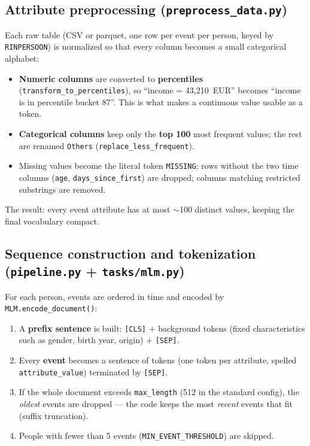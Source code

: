 \documentclass[11pt,a4paper]{article}
\newcommand{\file}[1]{\texttt{\small #1}}
\newcommand{\code}[1]{\texttt{\small #1}}
\begin{document}
\subsection{Attribute preprocessing (\file{preprocess\_data.py})}
Each raw table (CSV or parquet, one row per event per person, keyed by
\code{RINPERSOON}) is normalized so that every column becomes a small
categorical alphabet:
\begin{itemize}[nosep]
  \item \textbf{Numeric columns} are converted to \textbf{percentiles}
        (\code{transform\_to\_percentiles}), so ``income = 43{,}210~EUR'' becomes
        ``income is in percentile bucket 87''. This is what makes a continuous
        value usable as a token.
  \item \textbf{Categorical columns} keep only the \textbf{top 100} most frequent
        values; the rest are renamed \code{Others}
        (\code{replace\_less\_frequent}).
  \item Missing values become the literal token \code{MISSING}; rows without the
        two time columns (\code{age}, \code{days\_since\_first}) are dropped;
        columns matching restricted substrings are removed.
\end{itemize}
The result: every event attribute has at most $\sim$100 distinct values, keeping
the final vocabulary compact.

\subsection{Sequence construction and tokenization (\file{pipeline.py} + \file{tasks/mlm.py})}
For each person, events are ordered in time and encoded by
\code{MLM.encode\_document()}:
\begin{enumerate}[nosep]
  \item A \textbf{prefix sentence} is built:
        \code{[CLS]} $+$ background tokens (fixed characteristics such as gender,
        birth year, origin) $+$ \code{[SEP]}.
  \item Every \textbf{event} becomes a sentence of tokens (one token per
        attribute, spelled \code{attribute\_value}) terminated by \code{[SEP]}.
  \item If the whole document exceeds \code{max\_length} (512 in the standard
        config), the \emph{oldest} events are dropped --- the code keeps the most
        \emph{recent} events that fit (suffix truncation).
  \item People with fewer than 5 events (\code{MIN\_EVENT\_THRESHOLD}) are
        skipped.
\end{enumerate}
\end{document}
